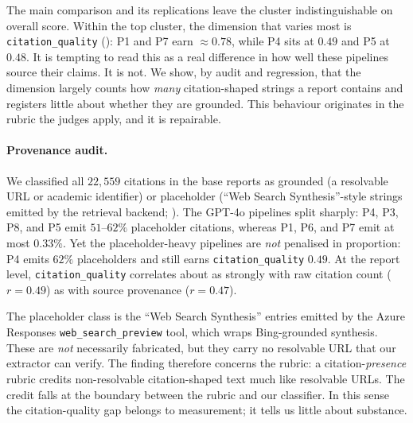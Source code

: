 \documentclass[11pt]{article}
\newcommand{\dimrow}[1]{\texttt{#1}}
\begin{document}
The main comparison and its replications leave the cluster indistinguishable on overall score. Within the top cluster, the dimension that varies most is \dimrow{citation\_quality}
(): P1 and P7 earn $\approx0.78$, while P4 sits at $0.49$ and P5 at $0.48$. It
is tempting to read this as a real difference in how well these pipelines source their
claims. It is not. We show, by audit and regression, that the dimension largely counts how
\emph{many} citation-shaped strings a report contains and registers little about whether they are
grounded. This behaviour originates in the rubric the judges apply, and it is repairable.

\paragraph{Provenance audit.} We classified all $22{,}559$ citations in the base
reports as grounded (a resolvable URL or academic identifier) or placeholder
(``Web Search Synthesis''-style strings emitted by the retrieval backend;
). The GPT-4o pipelines split sharply: P4, P3, P8, and P5 emit
$51$--$62\%$ placeholder citations, whereas P1, P6, and P7 emit at most $0.33\%$. Yet the
placeholder-heavy pipelines are \emph{not} penalised in proportion: P4 emits $62\%$
placeholders and still earns \dimrow{citation\_quality} $0.49$. At the report level,
\dimrow{citation\_quality} correlates about as strongly with raw citation count
($r=0.49$) as with source provenance ($r=0.47$).

The placeholder class is the
``Web Search Synthesis'' entries emitted by the
Azure Responses \texttt{web\_search\_preview} tool, which wraps Bing-grounded synthesis.
These are \emph{not} necessarily fabricated, but they carry no resolvable URL that our
extractor can verify. The finding therefore concerns the rubric: a citation-\emph{presence}
rubric credits non-resolvable citation-shaped text much like resolvable URLs. The credit
falls at the boundary between the rubric and our classifier. In this sense the
citation-quality gap belongs to measurement; it tells us little about substance.
\end{document}
